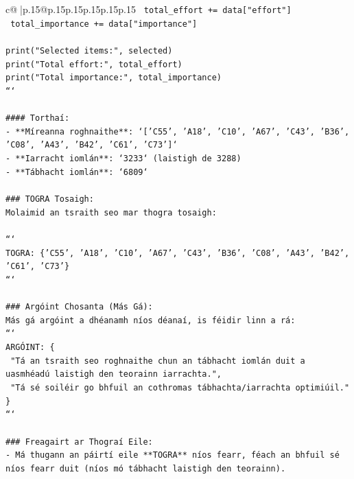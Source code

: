 \documentclass{article}
\begin{document}
{\begin{supertabular}{c@{$\;$}|p{.15\linewidth}@{}p{.15\linewidth}p{.15\linewidth}p{.15\linewidth}p{.15\linewidth}p{.15\linewidth}}
{{{\texttt{        total\_effort += data{[}"effort"{]}} \\
\texttt{        total\_importance += data{[}"importance"{]}} \\
\\ 
\texttt{print("Selected items:", selected)} \\
\texttt{print("Total effort:", total\_effort)} \\
\texttt{print("Total importance:", total\_importance)} \\
\texttt{```} \\
\\ 
\texttt{\#\#\#\# Torthaí:} \\
\texttt{{-} **Míreanna roghnaithe**: `{[}'C55', 'A18', 'C10', 'A67', 'C43', 'B36', 'C08', 'A43', 'B42', 'C61', 'C73'{]}`} \\
\texttt{{-} **Iarracht iomlán**: `3233` (laistigh de 3288)} \\
\texttt{{-} **Tábhacht iomlán**: `6809`} \\
\\ 
\texttt{\#\#\# TOGRA Tosaigh:} \\
\texttt{Molaimid an tsraith seo mar thogra tosaigh:} \\
\\ 
\texttt{```} \\
\texttt{TOGRA: \{'C55', 'A18', 'C10', 'A67', 'C43', 'B36', 'C08', 'A43', 'B42', 'C61', 'C73'\}} \\
\texttt{```} \\
\\ 
\texttt{\#\#\# Argóint Chosanta (Más Gá):} \\
\texttt{Más gá argóint a dhéanamh níos déanaí, is féidir linn a rá:} \\
\texttt{```} \\
\texttt{ARGÓINT: \{} \\
\texttt{    "Tá an tsraith seo roghnaithe chun an tábhacht iomlán duit a uasmhéadú laistigh den teorainn iarrachta.",} \\
\texttt{    "Tá sé soiléir go bhfuil an cothromas tábhachta/iarrachta optimiúil."} \\
\texttt{\}} \\
\texttt{```} \\
\\ 
\texttt{\#\#\# Freagairt ar Thograí Eile:} \\
\texttt{{-} Má thugann an páirtí eile **TOGRA** níos fearr, féach an bhfuil sé níos fearr duit (níos mó tábhacht laistigh den teorainn).} \\
}}}
\end{supertabular}}
\end{document}
